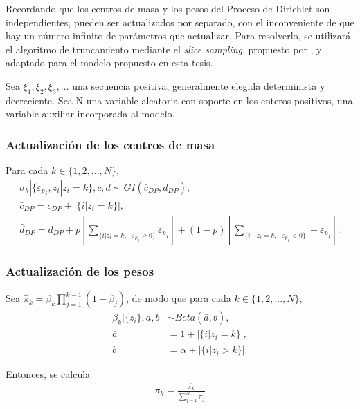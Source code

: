 Recordando que los centros de masa y los pesos del Proceso de Dirichlet son independientes, pueden ser actualizados por separado, con el inconveniente de que hay un n\'umero infinito de par\'ametros que actualizar. Para resolverlo, se utilizará el algoritmo de truncamiento mediante el \textit{slice sampling}, propuesto por \cite{Kalli_Slice}, y adaptado para el modelo propuesto en esta tesis.

Sea $\xi_1,\xi_2,\xi_3,...$ una secuencia positiva, generalmente elegida determinista y decreciente. Sea N una variable aleatoria con soporte en los enteros positivos, una variable auxiliar incorporada al modelo.

\subsubsection{Actualizaci\'on de los centros de masa}

Para cada $k \in \{1,2,...,N\}$,
\begin{equation*}
\begin{gathered}
    \sigma_k | \{{\varepsilon_p}_i, z_i | z_i = k\}, c, d \sim GI(\bar{c}_{DP}, \bar{d}_{DP}),\\
    \bar{c}_{DP} = c_{DP} + |\{i| z_i = k\}|, \\
    \bar{d}_{DP} = d_{DP} 
    + p \left[\sum_{\{i| z_i = k,\text{ }{\varepsilon_p}_i \geq 0\}} {\varepsilon_p}_i\right]
    + (1-p) \left[\sum_{\{i| \text{ } z_i = k,\text{ }{\varepsilon_p}_i < 0\}}  -{\varepsilon_p}_i\right].
\end{gathered}
\end{equation*}

\subsubsection{Actualizaci\'on de los pesos}

Sea $\hat{\pi}_k = \beta_k \prod_{j=1}^{k-1}(1 - \beta_j)$, de modo que para cada $k \in \{1,2,...,N\}$,
\begin{equation*}
\begin{aligned}
    \beta_k|\{z_i\}, a,b &\sim Beta(\bar{a}, \bar{b}), \\
    \bar{a} &= 1 + |\{i|z_i = k\}|, \\
    \bar{b} &= \alpha + |\{i|z_i > k\}|.
\end{aligned}
\end{equation*}

Entonces, se calcula
\begin{equation*}
\begin{aligned}
    \pi_k = \frac{\bar{\pi_k}}{\sum_{j=1}^N \bar{\pi_j}}
\end{aligned}
\end{equation*}


